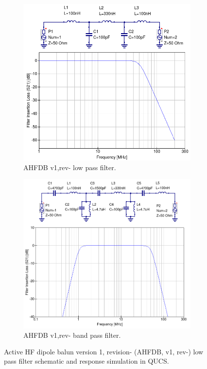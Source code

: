\begin{figure}[h]
  \centering
  \begin{subfigure}{.48\textwidth}
    \centering
    \includegraphics[width=.93\linewidth]{figures/lwa_lpf_50MHz.png}
    \caption{AHFDB v1,rev- low pass filter.}
	\label{fig:ahfdb_filter:lpf}
  \end{subfigure}%
  \begin{subfigure}{.48\textwidth}
    \centering
    \includegraphics[width=\linewidth]{figures/lwa_bpf_1MHz_50MHz.png}
    \caption{AHFDB v1,rev- band pass filter.}
	\label{fig:ahfdb_filter:bpf}
  \end{subfigure}
  \caption{Active HF dipole balun version 1, revision- (AHFDB, v1, rev-) low pass filter schematic and response simulation in QUCS.}
  \label{fig:ahfdb_filter}
\end{figure}

